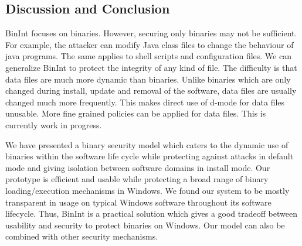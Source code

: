 \subsection{Discussion and Conclusion}
\label{sec:binint-conc}

BinInt focuses on binaries.
However, securing only binaries may not be sufficient.
For example, the attacker can modify Java class files to
change the behaviour of java programs.
The same applies to shell scripts and configuration files.
We can generalize BinInt to protect the integrity of any kind of file.
The difficulty is that data files are much more dynamic than binaries.
Unlike binaries which are only changed during install, update and removal
of the software, data files are usually changed much more frequently.
This makes direct use of d-mode for data files unusable.
More fine grained policies can be applied for data files.
This is currently work in progress.

We have presented a binary security model which caters to the
dynamic use of binaries within the software life cycle
while protecting against attacks in default mode
and giving isolation between software domains in install mode.
Our prototype is efficient and usable while
protecting a broad range of binary loading/execution mechanisms in Windows.
We found our system to be mostly transparent in usage on typical
Windows software throughout its software lifecycle.
Thus, BinInt is a practical solution
which gives a good tradeoff between usability and security
to protect binaries on Windows.
Our model can also be combined with other security mechanisms.

